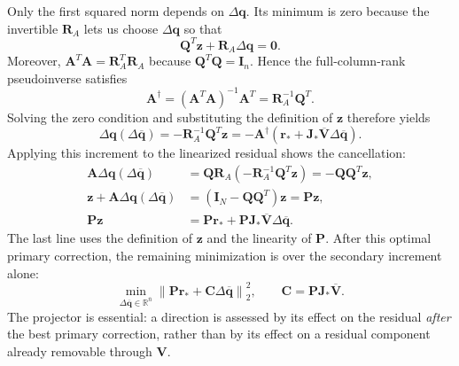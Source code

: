 \documentclass[11pt]{article}
\newcommand{\q}{\mathbf q}
\newcommand{\qbar}{\overline{\mathbf q}}
\newcommand{\norm}[1]{\left\lVert #1 \right\rVert}
\begin{document}
Only the first squared norm depends on $\Delta\q$.  Its minimum is zero
because the invertible $\mathbf R_A$ lets us choose $\Delta\q$ so that
\begin{equation*}
\mathbf Q^T\mathbf z+\mathbf R_A\Delta\q=\mathbf0.
\end{equation*}
Moreover, $\mathbf A^T\mathbf A=\mathbf R_A^T\mathbf R_A$ because
$\mathbf Q^T\mathbf Q=\mathbf I_n$.  Hence the full-column-rank
pseudoinverse satisfies
\begin{equation*}
\mathbf A^\dagger
=(\mathbf A^T\mathbf A)^{-1}\mathbf A^T
=\mathbf R_A^{-1}\mathbf Q^T.
\end{equation*}
Solving the zero condition and substituting the definition of $\mathbf z$
therefore yields
\begin{equation}
\Delta\q(\Delta\qbar)
=-\mathbf R_A^{-1}\mathbf Q^T\mathbf z
=-\mathbf A^\dagger
\left(\mathbf r_*+\mathbf J_*\overline{\mathbf V}\Delta\qbar\right).
\label{eq:adaptive-primary-elimination}
\end{equation}
Applying this increment to the linearized residual shows the cancellation:
\begin{equation*}
\begin{aligned}
\mathbf A\Delta\q(\Delta\qbar)
&=\mathbf Q\mathbf R_A(-\mathbf R_A^{-1}\mathbf Q^T\mathbf z)
=-\mathbf Q\mathbf Q^T\mathbf z,\\
\mathbf z+\mathbf A\Delta\q(\Delta\qbar)
&=(\mathbf I_N-\mathbf Q\mathbf Q^T)\mathbf z
=\mathbf P\mathbf z,\\
\mathbf P\mathbf z
&=\mathbf P\mathbf r_*
+\mathbf P\mathbf J_*\overline{\mathbf V}\Delta\qbar.
\end{aligned}
\end{equation*}
The last line uses the definition of $\mathbf z$ and the linearity of
$\mathbf P$.  After this optimal primary correction, the remaining
minimization is over the secondary increment alone:
\begin{equation}
\min_{\Delta\qbar\in\mathbb R^{\bar n}}
\norm{\mathbf P\mathbf r_*+\mathbf C\Delta\qbar}_2^2,
\qquad \mathbf C=\mathbf P\mathbf J_*\overline{\mathbf V}.
\label{eq:adaptive-secondary-ls}
\end{equation}
The projector is essential: a direction is assessed by its effect on the
residual \emph{after} the best primary correction, rather than by its effect
on a residual component already removable through $\mathbf V$.
\end{document}
